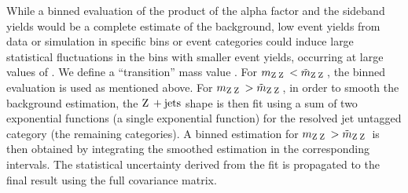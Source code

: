  While a binned evaluation of the product of the alpha factor and the sideband yields would
 be a complete estimate of the background, low event yields from data or simulation in specific
 bins or event categories could induce large statistical fluctuations
 in the bins with smaller event yields, occurring at large values of \mZZ.
 We define a ``transition'' mass value \mZZtilde. For $m_{\mathrm{Z}\hspace{0.2em}\mathrm{Z}\hspace{0.2em}} < \tilde{m}_{\mathrm{Z}\hspace{0.2em}\mathrm{Z}\hspace{0.2em}}$, the
 binned evaluation is used as mentioned above. For $m_{\mathrm{Z}\hspace{0.2em}\mathrm{Z}\hspace{0.2em}} > \tilde{m}_{\mathrm{Z}\hspace{0.2em}\mathrm{Z}\hspace{0.2em}}$,
 in order to smooth the background estimation, the $\mathrm{Z}\hspace{0.2em} + \text{jets}$ shape is then fit using a sum of two exponential functions (a single exponential function) for the resolved jet untagged category (the remaining categories). A binned estimation
 for $m_{\mathrm{Z}\hspace{0.2em}\mathrm{Z}\hspace{0.2em}} > \tilde{m}_{\mathrm{Z}\hspace{0.2em}\mathrm{Z}\hspace{0.2em}}$ is then obtained by integrating the smoothed
 estimation in the corresponding intervals. The statistical uncertainty derived from the fit is propagated to the final result using the full covariance matrix.
